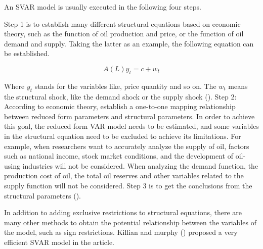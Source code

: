 An SVAR model is usually executed in the following four steps. 

Step 1 is to establish many different structural equations based on economic theory, such as the function of oil production and price, or the function of oil demand and supply. Taking the latter as an example, the following equation can be established.

\[A(L) y_{t}=c+w_{t}\]

Where $y_{t}$ stands for the variables like, price quantity and so on. The $w_{t}$ means the structural shock, like the demand shock or the supply shock (\cite{huntington2013oil}).
Step 2: According to economic theory, establish a one-to-one mapping relationship between reduced form parameters and structural parameters. In order to achieve this goal, the reduced form VAR model needs to be estimated, and some variables in the structural equation need to be excluded to achieve its limitations. For example, when researchers want to accurately analyze the supply of oil, factors such as national income, stock market conditions, and the development of oil-using industries will not be considered. When analyzing the demand function, the production cost of oil, the total oil reserves and other variables related to the supply function will not be considered. Step 3 is to get the conclusions from the structural parameters (\cite{huntington2013oil}).  

In addition to adding exclusive restrictions to structural equations, there are many other methods to obtain the potential relationship between the variables of the model, such as sign restrictions. Killian and murphy (\cite{kilian2014role}) proposed a very efficient SVAR model in the article. 

